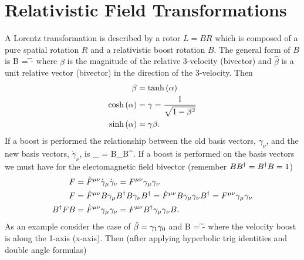 \section{Relativistic Field Transformations}
A Lorentz transformation is described by a rotor $L = BR$ which is composed of a pure spatial rotation $R$ and a relativistic boost rotation $B$.  The
general form of $B$ is 
\be
	B = \f{\cosh}{}-\f{\sinh}{}\hat{\beta}
\ee 
where $\beta$ is the magnitude of the relative 3-velocity (bivector) and $\hat{\beta}$ is a unit relative vector (bivector) in the direction of the 3-velocity.  Then
\begin{align}
	\beta &= {\tanh}\left ( {\alpha} \right ) \label{eq8_26}\\
	{\cosh}\left ( {\alpha} \right ) &= \gamma = \frac{1}{\sqrt{1-\beta^{2}}} \label{eq8_27}\\
	{\sinh}\left ( {\alpha} \right ) &= \gamma\beta. \label{eq8_28}
\end{align}
If a boost is performed the relationship between the old basis vectors, $\gamma_{\nu}$, and the new basis vectors, $\grave{\gamma}_{\nu}$, is
\be
	\grave{\gamma}_{\nu} = B\gamma_{\nu}B^{\R}.
\ee
If a boost is performed on the basis vectors we must have for the electomagnetic field bivector (remember $BB^{\dagger}=B^{\dagger}B=1$)
\begin{align}
	F &= \grave{F}^{\mu\nu}\grave{\gamma}_{\mu}\grave{\gamma}_{\nu} = F^{\mu\nu}\gamma_{\mu}\gamma_{\nu} \\
	F &= \grave{F}^{\mu\nu}B\gamma_{\mu}B^{\dagger}B\gamma_{\nu}B^{\dagger} = \grave{F}^{\mu\nu}B\gamma_{\mu}\gamma_{\nu}B^{\dagger} = F^{\mu\nu}\gamma_{\mu}\gamma_{\nu} \\
	B^{\dagger}FB &= \grave{F}^{\mu\nu}\gamma_{\mu}\gamma_{\nu} = F^{\mu\nu}B^{\dagger}\gamma_{\mu}\gamma_{\nu}B.
\end{align}
As an example consider the case of $\hat{\beta}=\gamma_{1}\gamma_{0}$ and
\be
	B = \f{\cosh}{}-\f{\sinh}{}
\ee 
where the velocity boost is along the 1-axis (x-axis). Then (after applying hyperbolic trig identities and double angle formulas)
